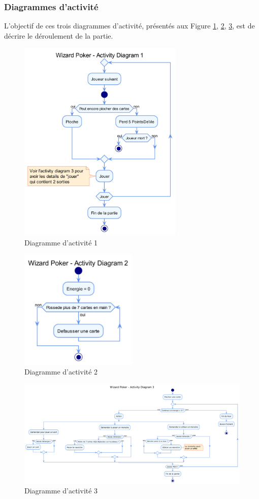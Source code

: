 \documentclass[11pt,a4paper]{article}
\begin{document}
\subsubsection{Diagrammes d'activité}
L'objectif de ces trois diagrammes d'activité, présentés aux Figure \ref{fig:act1}, \ref{fig:act2}, \ref{fig:act3}, est de décrire le déroulement de la partie.
\begin{figure}[ht]
  \centering
  \includegraphics[width=0.7\textwidth]{assets/uml/ActivityDiagram1.png}
  \caption{\label{fig:act1} Diagramme d'activité 1}
\end{figure}

\begin{figure}[ht]
  \centering
  \includegraphics[width=0.5\textwidth]{assets/uml/ActivityDiagram2.png}
  \caption{\label{fig:act2} Diagramme d'activité 2}
\end{figure}

\begin{figure}
  \centering
  \includegraphics[width=1\textwidth]{assets/uml/ActivityDiagram3.png}
  \caption{\label{fig:act3} Diagramme d'activité 3}
\end{figure}

\clearpage
\printindex
\end{document}
